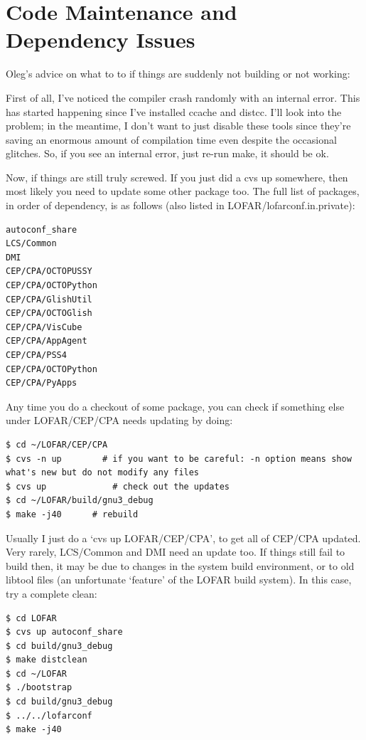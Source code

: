 \documentclass[10pt]{article}
\begin{document}
\section {Code Maintenance and Dependency Issues} 
 
Oleg's advice on what to to if things are suddenly not building 
or not working: 

First of all, I've noticed the compiler crash randomly with an internal 
error. This has started happening since I've installed ccache and 
distcc. I'll look into the problem; in the meantime, I don't want to 
just disable these tools since they're saving an enormous amount of 
compilation time even despite the occasional glitches. So, if you see an 
internal error, just re-run make, it should be ok.

Now, if things are still truly screwed. If you just did a cvs up 
somewhere, then most likely you need to update some other package too. 
The full list of packages, in order of dependency, is as follows (also 
listed in LOFAR/lofarconf.in.private):

\begin{verbatim}
autoconf_share
LCS/Common
DMI
CEP/CPA/OCTOPUSSY
CEP/CPA/OCTOPython
CEP/CPA/GlishUtil
CEP/CPA/OCTOGlish
CEP/CPA/VisCube
CEP/CPA/AppAgent
CEP/CPA/PSS4
CEP/CPA/OCTOPython
CEP/CPA/PyApps
\end{verbatim}

Any time you do a checkout of some package, you
can check if something else under LOFAR/CEP/CPA needs updating by doing:
                                                                                
\begin{verbatim}
$ cd ~/LOFAR/CEP/CPA
$ cvs -n up        # if you want to be careful: -n option means show
what's new but do not modify any files
$ cvs up             # check out the updates
$ cd ~/LOFAR/build/gnu3_debug
$ make -j40      # rebuild
\end{verbatim}

Usually I just do a `cvs up LOFAR/CEP/CPA', to get all of CEP/CPA updated.
Very rarely, LCS/Common and DMI need an update too. If things still fail to
build then, it may be due to changes in the system build environment, or to
old libtool files (an unfortunate `feature' of the LOFAR build system). In
this case, try a complete clean:

\begin{verbatim}
$ cd LOFAR
$ cvs up autoconf_share
$ cd build/gnu3_debug
$ make distclean
$ cd ~/LOFAR
$ ./bootstrap
$ cd build/gnu3_debug
$ ../../lofarconf 
$ make -j40
\end{verbatim}
\end{document}
